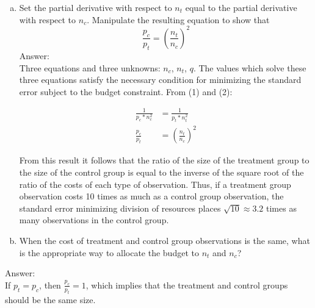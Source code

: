 \documentclass[11pt,notitlepage]{article}\usepackage[]{graphicx}\usepackage[]{color}
\begin{document}
\begin{enumerate}[a)]
\item Set the partial derivative with respect to $n_t$ equal to the partial derivative with respect to $n_c$. Manipulate the resulting equation to show that
\begin{equation*}
\frac{p_c}{p_t} = (\frac{n_t}{n_c})^{2}
\end{equation*}
Answer:\\
Three equations and three unknowns: $n_c$, $n_t$, $q$. The values which solve these three equations satisfy the necessary condition for minimizing the standard error subject to the budget constraint.
From (1) and (2): 

\begin{align*}
\frac{1}{p_c*n_c^2} &= \frac{1}{p_t*n_t^2}\\
\frac{p_c}{p_t} &= (\frac{n_t}{n_c})^{2}
\end{align*}

From this result it follows that the ratio of the size of the treatment group to the size of the control group is equal to the inverse of the square root of the ratio of the costs of each type of observation. Thus, if a treatment group observation costs 10 times as much as a control group observation, the standard error minimizing division of resources places $\sqrt{10} \approx 3.2$ times as many observations in the control group.

\item When the cost of treatment and control group observations is the same, what is the appropriate way to allocate the budget to $n_t$ and $n_c$?
\end{enumerate}
Answer:\\
If $p_t = p_c$, then $\frac{p_c}{p_t} = 1$, which implies that the treatment and control groups should be the same size.
\end{document}
